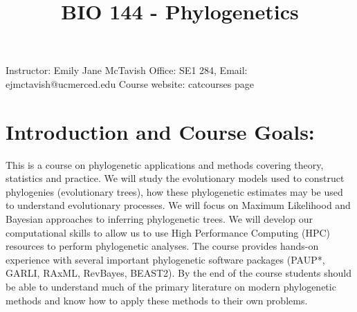 \documentclass{article}
\title{BIO 144 - Phylogenetics}
\begin{document}
\maketitle
Instructor: Emily Jane McTavish
Office: SE1 284, Email: ejmctavish@ucmerced.edu
Course website: catcourses page

\section*{Introduction and Course Goals:}

This is a course on phylogenetic applications and methods covering theory, statistics and practice.
We will study the evolutionary models used to construct phylogenies (evolutionary trees), 
how these phylogenetic estimates may be used to understand evolutionary processes.
We will focus on Maximum Likelihood and Bayesian approaches to inferring phylogenetic trees.
We will develop our computational skills to allow us to use High Performance Computing (HPC) resources to 
perform phylogenetic analyses.
The course provides hands-on experience with several important phylogenetic software packages (PAUP*, GARLI, RAxML, RevBayes, BEAST2).
By the end of the course students should be able to understand much of the primary literature on modern phylogenetic methods and
know how to apply these methods to their own problems. 
\end{document}

